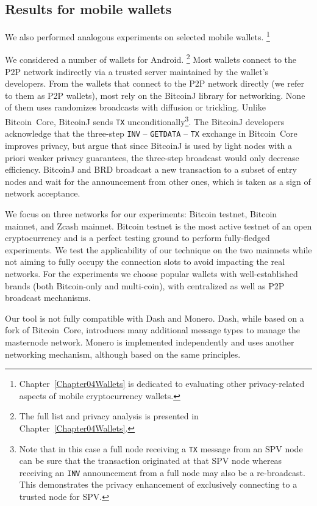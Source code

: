 \subsection{Results for mobile wallets}

We also performed analogous experiments on selected mobile wallets.
\footnote{Chapter~\ref{Chapter04Wallets} is dedicated to evaluating other privacy-related aspects of mobile cryptocurrency wallets.}

We considered a number of wallets for Android.
\footnote{The full list and privacy analysis is presented in Chapter~\ref{Chapter04Wallets}.}
Most wallets connect to the P2P network indirectly via a trusted server maintained by the wallet's developers.
From the wallets that connect to the P2P network directly (we refer to them as P2P wallets), most rely on the BitcoinJ library for networking.
None of them uses randomizes broadcasts with diffusion or trickling.
Unlike Bitcoin~Core, BitcoinJ sends \texttt{TX} unconditionally\footnote{Note that in this case a full node receiving a \texttt{TX} message from an SPV node can be sure that the transaction originated at that SPV node whereas receiving an \texttt{INV} announcement from a full node may also be a re-broadcast. This demonstrates the privacy enhancement of exclusively connecting to a trusted node for SPV.}.
The BitcoinJ developers acknowledge that the three-step \texttt{INV} -- \texttt{GETDATA} -- \texttt{TX} exchange in Bitcoin~Core improves privacy, but argue that since BitcoinJ is used by light nodes with a priori weaker privacy guarantees, the three-step broadcast would only decrease efficiency.
BitcoinJ and BRD broadcast a new transaction to a subset of entry nodes and wait for the announcement from other ones, which is taken as a sign of network acceptance.

We focus on three networks for our experiments: Bitcoin testnet, Bitcoin mainnet, and Zcash mainnet.
Bitcoin testnet is the most active testnet of an open cryptocurrency and is a perfect testing ground to perform fully-fledged experiments.
We test the applicability of our technique on the two mainnets while not aiming to fully occupy the connection slots to avoid impacting the real networks.
For the experiments we choose popular wallets with well-established brands (both Bitcoin-only and multi-coin), with centralized as well as P2P broadcast mechanisms.

Our tool is not fully compatible with Dash and Monero.
Dash, while based on a fork of Bitcoin~Core, introduces many additional message types to manage the masternode network.
Monero is implemented independently and uses another networking mechanism, although based on the same principles.

